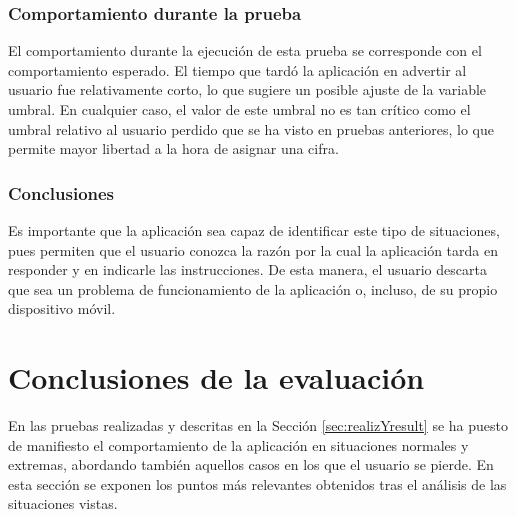 \subsubsection*{Comportamiento durante la prueba}

El comportamiento durante la ejecución de esta prueba se corresponde con el comportamiento esperado. El tiempo que tardó la aplicación en advertir al usuario fue relativamente corto, lo que sugiere un posible ajuste de la variable umbral. En cualquier caso, el valor de este umbral no es tan crítico como el umbral relativo al usuario perdido que se ha visto en pruebas anteriores, lo que permite mayor libertad a la hora de asignar una cifra.

\subsubsection*{Conclusiones}

Es importante que la aplicación sea capaz de identificar este tipo de situaciones, pues permiten que el usuario conozca la razón por la cual la aplicación tarda en responder y en indicarle las instrucciones. De esta manera, el usuario descarta que sea un problema de funcionamiento de la aplicación o, incluso, de su propio dispositivo móvil. 


\section{Conclusiones de la evaluación}
\label{sec:conclusionesEval}

En las pruebas realizadas y descritas en la Sección \ref{sec:realizYresult} se ha puesto de manifiesto el comportamiento de la aplicación en situaciones normales y extremas, abordando también aquellos casos en los que el usuario se pierde. En esta sección se exponen los puntos más relevantes obtenidos tras el análisis de las situaciones vistas.


